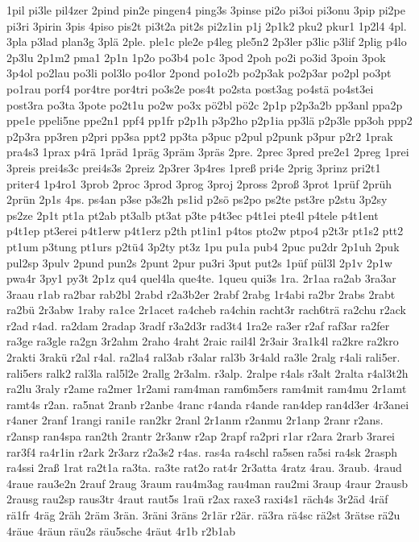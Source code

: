 {1pil
pi3le
pil4zer
2pind
pin2e
pingen4
ping3s
3pinse
pi2o
pi3oi
pi3onu
3pip
pi2pe
pi3ri
3pirin
3pis
4piso
pis2t
pi3t2a
pit2s
pi2z1in
p1j
2p1k2
pku2
pkur1
1p2l4
4pl.
3pla
p3lad
plan3g
3plä
2ple.
ple1c
ple2e
p4leg
ple5n2
2p3ler
p3lic
p3lif
2plig
p4lo
2p3lu
2p1m2
pma1
2p1n
1p2o
po3b4
po1c
3pod
2poh
po2i
po3id
3poin
3pok
3p4ol
po2lau
po3li
pol3lo
po4lor
2pond
po1o2b
po2p3ak
po2p3ar
po2pl
po3pt
po1rau
porf4
por4tre
por4tri
po3s2e
pos4t
po2sta
post3ag
po4stä
po4st3ei
post3ra
po3ta
3pote
po2t1u
po2w
po3x
pö2bl
pö2c
2p1p
p2p3a2b
pp3anl
ppa2p
ppe1e
ppeli5ne
ppe2n1
ppf4
pp1fr
p2p1h
p3p2ho
p2p1ia
pp3lä
p2p3le
pp3oh
ppp2
p2p3ra
pp3ren
p2pri
pp3sa
ppt2
pp3ta
p3puc
p2pul
p2punk
p3pur
p2r2
1prak
pra4s3
1prax
p4rä
1präd
1präg
3präm
3präs
2pre.
2prec
3pred
pre2e1
2preg
1prei
3preis
prei4s3c
prei4s3s
2preiz
2p3rer
3p4res
1preß
pri4e
2prig
3prinz
pri2t1
priter4
1p4ro1
3prob
2proc
3prod
3prog
3proj
2pross
2proß
3prot
1prüf
2prüh
2prün
2p1s
4ps.
ps4an
p3se
p3s2h
ps1id
p2sö
ps2po
ps2te
pst3re
p2stu
3p2sy
ps2ze
2p1t
pt1a
pt2ab
pt3alb
pt3at
p3te
p4t3ec
p4t1ei
pte4l
p4tele
p4t1ent
p4t1ep
pt3erei
p4t1erw
p4t1erz
p2th
pt1in1
p4tos
pto2w
ptpo4
p2t3r
pt1s2
ptt2
pt1um
p3tung
pt1urs
p2tü4
3p2ty
pt3z
1pu
pu1a
pub4
2puc
pu2dr
2p1uh
2puk
pul2sp
3pulv
2pund
pun2s
2punt
2pur
pu3ri
3put
put2s
1püf
pül3l
2p1v
2p1w
pwa4r
3py1
py3t
2p1z
qu4
quel4la
que4te.
1queu
qui3s
1ra.
2r1aa
ra2ab
3ra3ar
3raau
r1ab
ra2bar
rab2bl
2rabd
r2a3b2er
2rabf
2rabg
1r4abi
ra2br
2rabs
2rabt
ra2bü
2r3abw
1raby
ra1ce
2r1acet
ra4cheb
ra4chin
racht3r
rach6trä
ra2chu
r2ack
r2ad
r4ad.
ra2dam
2radap
3radf
r3a2d3r
rad3t4
1ra2e
ra3er
r2af
raf3ar
ra2fer
ra3ge
ra3gle
ra2gn
3r2ahm
2raho
4raht
2raic
rail4l
2r3air
3ra1k4l
ra2kre
ra2kro
2rakti
3rakü
r2al
r4al.
ra2la4
ral3ab
r3alar
ral3b
3r4ald
ra3le
2ralg
r4ali
rali5er.
rali5ers
ralk2
ral3la
ral5l2e
2rallg
2r3alm.
r3alp.
2ralpe
r4als
r3alt
2ralta
r4al3t2h
ra2lu
3raly
r2ame
ra2mer
1r2ami
ram4man
ram6m5ers
ram4mit
ram4mu
2r1amt
ramt4s
r2an.
ra5nat
2ranb
r2anbe
4ranc
r4anda
r4ande
ran4dep
ran4d3er
4r3anei
r4aner
2ranf
1rangi
rani1e
ran2kr
2ranl
2r1anm
r2anmu
2r1anp
2ranr
r2ans.
r2ansp
ran4spa
ran2th
2rantr
2r3anw
r2ap
2rapf
ra2pri
r1ar
r2ara
2rarb
3rarei
rar3f4
ra4r1in
r2ark
2r3arz
r2a3s2
r4as.
ras4a
ra4schl
ra5sen
ra5si
ra4sk
2rasph
ra4ssi
2raß
1rat
ra2t1a
ra3ta.
ra3te
rat2o
rat4r
2r3atta
4ratz
4rau.
3raub.
4raud
4raue
rau3e2n
2rauf
2raug
3raum
rau4m3ag
rau4man
rau2mi
3raup
4raur
2rausb
2rausg
rau2sp
raus3tr
4raut
raut5s
1raü
r2ax
raxe3
raxi4s1
räch4s
3r2äd
4räf
rä1fr
4räg
2räh
2räm
3rän.
3räni
3räns
2r1är
r2är.
rä3ra
rä4sc
rä2st
3rätse
rä2u
4räue
4räun
räu2s
räu5sche
4räut
4r1b
r2b1ab
}
